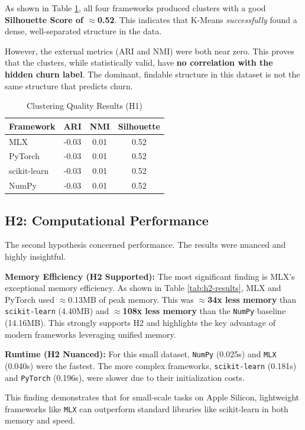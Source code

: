 \documentclass[twocolumn,a4paper]{article}
\begin{document}
As shown in Table \ref{tab:h1-results}, all four frameworks produced clusters with a good \textbf{Silhouette Score of $\approx$0.52}. This indicates that K-Means \textit{successfully} found a dense, well-separated structure in the data.

However, the external metrics (ARI and NMI) were both near zero. This proves that the clusters, while statistically valid, have \textbf{no correlation with the hidden churn label}. The dominant, findable structure in this dataset is not the same structure that predicts churn.

\begin{table}[htbp]
\centering
\caption{Clustering Quality Results (H1)}
\label{tab:h1-results}
\begin{tabular}{@{}l|c|c|c@{}}
\toprule
Framework & ARI & NMI & Silhouette \\
\midrule
MLX & -0.03 & 0.01 & 0.52 \\
PyTorch & -0.03 & 0.01 & 0.52 \\
scikit-learn & -0.03 & 0.01 & 0.52 \\
NumPy & -0.03 & 0.01 & 0.52 \\
\bottomrule
\end{tabular}
\end{table}

\subsection{H2: Computational Performance}
The second hypothesis concerned performance. The results were nuanced and highly insightful.

\textbf{Memory Efficiency (H2 Supported):}
The most significant finding is MLX's exceptional memory efficiency. As shown in Table \ref{tab:h2-results}, MLX and PyTorch used $\approx$0.13MB of peak memory. This was \textbf{$\approx$34x less memory} than \texttt{scikit-learn} (4.40MB) and \textbf{$\approx$108x less memory} than the \texttt{NumPy} baseline (14.16MB). This strongly supports H2 and highlights the key advantage of modern frameworks leveraging unified memory.

\textbf{Runtime (H2 Nuanced):}
For this small dataset, \texttt{NumPy} (0.025s) and \texttt{MLX} (0.040s) were the fastest. The more complex frameworks, \texttt{scikit-learn} (0.181s) and \texttt{PyTorch} (0.196s), were slower due to their initialization costs.

This finding demonstrates that for small-scale tasks on Apple Silicon, lightweight frameworks like \texttt{MLX} can outperform standard libraries like scikit-learn in both memory and speed.
\end{document}
